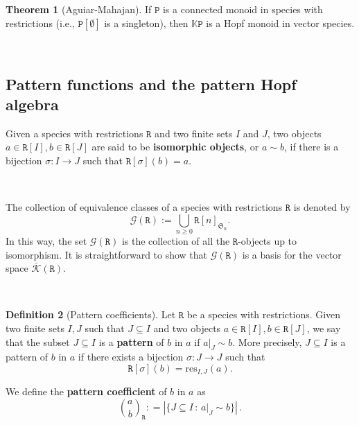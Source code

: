 \documentclass[12pt, reqno]{amsart}
\theoremstyle{definition}
\newtheorem{thm}{Theorem}[section]
\newtheorem{defin}[thm]{Definition}
\newcommand{\prP}{\mathtt{P}}
\newcommand{\prR}{\mathtt{R}}
\newcommand{\Kc}{\mathcal{K}}
\newcommand{\Kcb}{\overline{\Kc}}
\begin{document}
\begin{thm}[Aguiar-Mahajan]\label{MonRestr2}
If $\prP$ is a connected monoid in species with restrictions (i.e., $\prP[\emptyset]$ is a singleton), then $\mathbb{K}\prP$ is a Hopf monoid in vector species.
\end{thm}

\

\subsection{Pattern functions and the pattern Hopf algebra}


Given a species with restrictions $\prR$ and two finite sets $I$ and $J$, two objects $a\in \prR[I], b\in \prR[J]$ are said to be {\bf isomorphic objects}, or $a\sim b$, if there is a bijection $\sigma:I\to J$ such that $\prR[\sigma](b)=a$. 

\

The collection of equivalence classes of a species with restrictions $\prR$ is denoted by \begin{equation}
\mathcal{G}(\prR) := \bigcup_{n\geq 0 } \prR[n]_{\mathfrak{S}_n}.
\end{equation}
In this way, the set $\mathcal G(\prR) $ is the collection of all the $\prR$-objects up to isomorphism. It is straightforward to show that $\mathcal{G}(\prR)$ is a basis for the vector space $\Kcb(\prR)$.

\


\begin{defin}[Pattern coefficients]\label{defin:patterncoeff}
Let $\prR$ be a species with restrictions. Given two finite sets $I,J$ such that $J \subseteq I$ and two objects $a\in \prR[I], b\in \prR[J]$,
we say that the subset $J \subseteq I$ is a {\bf pattern} of $b$ in $a$ if $a|_{J} \sim b$. More precisely, $J \subseteq I$ is a pattern of $b$ in $a$ if there exists a bijection $\sigma: J \to J$ such that
\[\prR[\sigma](b)=\text{res}_{I,J}(a).\]

We define the {\bf pattern coefficient} of $b$ in $a$ as
\begin{equation}
    \binom{a}{b}_{\!\prR} : = \left| \{J \subseteq I \, : \, a|_J \sim b \} \right| \, .
\end{equation}
\end{defin}
\end{document}
